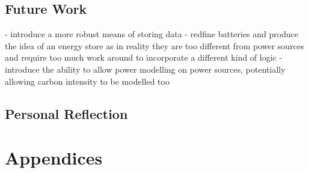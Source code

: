 \documentclass{l4proj}
\begin{document}
\section{Future Work}\label{conc:sec:Future Work}
- introduce a more robust means of storing data
- redfine batteries and produce the idea of an energy store as in reality they are too different from power sources and require too much work around to incorporate a different kind of logic
- introduce the ability to allow power modelling on power sources, potentially allowing carbon intensity to be modelled too
\section{Personal Reflection}\label{conc:sec:Personal Reflection}

%
% 
\chapter{Appendices}
\end{document}

